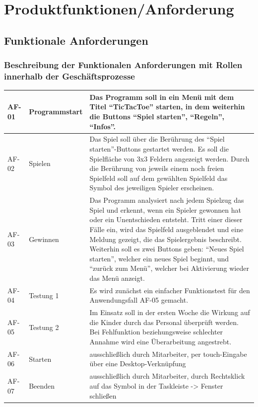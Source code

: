 \documentclass[12pt]{article}
\begin{document}
\section{Produktfunktionen/Anforderung}
\subsection{Funktionale Anforderungen}
\subsubsection{Beschreibung der Funktionalen Anforderungen mit Rollen innerhalb der Geschäftsprozesse}
\begin{tabularx}{\textwidth}{|l|l|X|} \hline
AF-01&Programmstart&Das Programm soll in ein Menü mit dem Titel "`\Gls{TicTacToe}"' starten, in dem weiterhin die \Glspl{Button} "`Spiel starten"', "`Regeln"', "`Infos"'.\\ \hline
AF-02&Spielen&Das Spiel soll über die Berührung des "`Spiel starten"'-\Glspl{Button} gestartet werden. Es soll die Spielfläche von 3x3 Feldern angezeigt werden. Durch die Berührung von jeweils einem noch freien Spielfeld soll auf dem gewählten Spielfeld das Symbol des jeweiligen Spieler erscheinen.\\ \hline
AF-03&Gewinnen&Das Programm analysiert nach jedem Spielzug das Spiel und erkennt, wenn ein Spieler gewonnen hat oder ein Unentschieden entsteht. Tritt einer dieser Fälle ein, wird das Spielfeld ausgeblendet und eine Meldung gezeigt, die das Spielergebnis beschreibt. Weiterhin soll es zwei \Glspl{Button} geben: "`Neues Spiel starten"', welcher ein neues Spiel beginnt, und "`zurück zum Menü"', welcher bei Aktivierung wieder das Menü anzeigt.\\ \hline
AF-04&Testung 1&Es wird zunächst ein einfacher Funktionstest für den Anwendungsfall AF-05 gemacht. \\ \hline
AF-05&Testung 2&Im Einsatz soll in der ersten Woche die Wirkung auf die Kinder durch das Personal überprüft werden. Bei Fehlfunktion beziehungsweise schlechter Annahme wird eine Überarbeitung angestrebt.\\ \hline
AF-06&Starten&ausschließlich durch Mitarbeiter, per touch-Eingabe über eine Desktop-Verknüpfung\\ \hline
AF-07&Beenden&ausschließlich durch Mitarbeiter, durch Rechtsklick auf das Symbol in der Taskleiste -> Fenster schließen\\ \hline

\end{tabularx}\\
\end{document}
